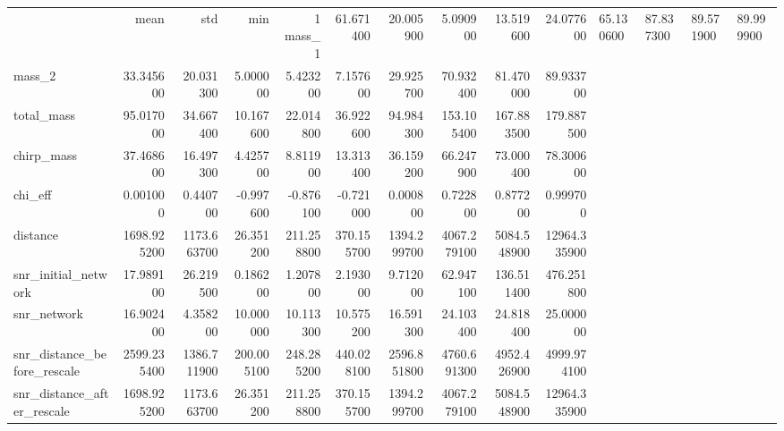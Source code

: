\begin{tabular}{lrrrrrrrrr}
\toprule
 & mean & std & min & 1%
\midrule
mass_1 & 61.671400 & 20.005900 & 5.090900 & 13.519600 & 24.077600 & 65.130600 & 87.837300 & 89.571900 & 89.999900 \\
mass_2 & 33.345600 & 20.031300 & 5.000000 & 5.423200 & 7.157600 & 29.925700 & 70.932400 & 81.470000 & 89.933700 \\
total_mass & 95.017000 & 34.667400 & 10.167600 & 22.014800 & 36.922600 & 94.984300 & 153.105400 & 167.883500 & 179.887500 \\
chirp_mass & 37.468600 & 16.497300 & 4.425700 & 8.811900 & 13.313400 & 36.159200 & 66.247900 & 73.000400 & 78.300600 \\
chi_eff & 0.001000 & 0.440700 & -0.997600 & -0.876100 & -0.721000 & 0.000800 & 0.722800 & 0.877200 & 0.999700 \\
distance & 1698.925200 & 1173.663700 & 26.351200 & 211.258800 & 370.155700 & 1394.299700 & 4067.279100 & 5084.548900 & 12964.335900 \\
snr_initial_network & 17.989100 & 26.219500 & 0.186200 & 1.207800 & 2.193000 & 9.712000 & 62.947100 & 136.511400 & 476.251800 \\
snr_network & 16.902400 & 4.358200 & 10.000000 & 10.113300 & 10.575200 & 16.591300 & 24.103400 & 24.818400 & 25.000000 \\
snr_distance_before_rescale & 2599.235400 & 1386.711900 & 200.005100 & 248.285200 & 440.028100 & 2596.851800 & 4760.691300 & 4952.426900 & 4999.974100 \\
snr_distance_after_rescale & 1698.925200 & 1173.663700 & 26.351200 & 211.258800 & 370.155700 & 1394.299700 & 4067.279100 & 5084.548900 & 12964.335900 \\
\bottomrule
\end{tabular}
